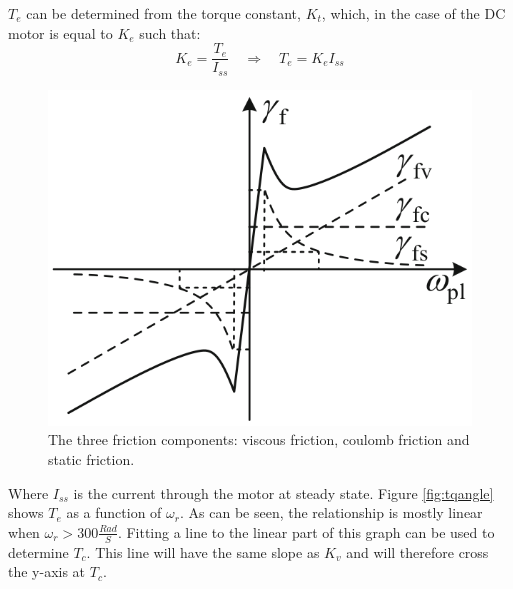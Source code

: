 $T_e$ can be determined from the torque constant, $K_t$, which, in the case of the DC motor is equal to $K_e$ such that:
$$K_e = \frac{T_e}{I_{ss}} \quad \Rightarrow \quad T_e = K_eI_{ss}$$

\begin{figure}[!h]
	\centering
	\includegraphics[width=.5\linewidth]{graphics/friction}
	\caption[The three friction components]{The three friction components: viscous friction, coulomb friction and static friction.}
	\label{fig:friction}
\end{figure}

Where $I_{ss}$ is the current through the motor at steady state.
Figure \ref{fig:tqangle} shows $T_e$ as a function of $\omega_r$.
As can be seen, the relationship is mostly linear when $\omega_r>300\frac{Rad}{S}$.
Fitting a line to the linear part of this graph can be used to determine $T_c$.
This line will have the same slope as $K_v$ and will therefore cross the y-axis at $T_c$.

